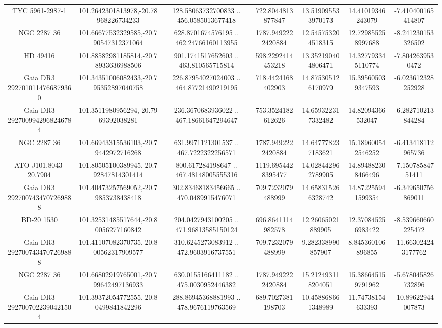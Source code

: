 \begin{table}
\begin{tabular}{ccccccc}
TYC 5961-2987-1 & 101.2642301813978,-20.78968226734233 & 128.58063732700833 .. 456.0585013677418 & 722.8044813877847 & 13.519095533970173 & 14.41019346243079 & -7.410400165414807 \\
NGC  2287    36 & 101.66677532329585,-20.790547312371064 & 628.8701674576195 .. 462.24766160113955 & 1787.9492222420884 & 12.545753204518315 & 12.729855258997688 & -8.241230153326502 \\
HD  49416 & 101.88582981185814,-20.78933636988506 & 901.1741517652603 .. 463.810565715814 & 598.2292414453218 & 13.352190404806471 & 14.327793345110774 & -7.8042639530472 \\
Gaia DR3 2927010114766879360 & 101.34351006082433,-20.795352897040758 & 226.87954027024003 .. 464.87721490219195 & 718.4424168402903 & 14.875305126170979 & 15.395605039347593 & -6.023612328252928 \\
Gaia DR3 2927009942968246784 & 101.3511980956294,-20.7969392038281 & 236.3670683936022 .. 467.18661647294647 & 753.3524182612626 & 14.659322317332482 & 14.82094366532047 & -6.282710213844284 \\
NGC  2287    36 & 101.66943315536103,-20.79442972716268 & 631.9971121301537 .. 467.7222322256571 & 1787.9492222420884 & 14.647778237183621 & 15.189600542546252 & -6.413418112965736 \\
ATO J101.8043-20.7904 & 101.80505100389945,-20.792847814301414 & 800.617284198647 .. 467.48148005555316 & 1119.6954428395477 & 14.028442962789905 & 14.894882308466496 & -7.15078584751411 \\
Gaia DR3 2927007434707269888 & 101.40473257569052,-20.79853738438418 & 302.83468183456665 .. 470.0489915476071 & 709.7232079488999 & 14.658315266328742 & 14.872255941599354 & -6.349650756869011 \\
BD-20  1530 & 101.32531485517644,-20.80056277160842 & 204.0427943100205 .. 471.96813585150124 & 696.8641114982578 & 12.26065021889905 & 12.370845256983422 & -8.539660660225472 \\
Gaia DR3 2927007434707269888 & 101.41107082370735,-20.800562317909577 & 310.6245273083912 .. 472.9603916737551 & 709.7232079488999 & 9.282338990857907 & 8.845360106896855 & -11.663024243177762 \\
NGC  2287    36 & 101.66802919765001,-20.799642497136933 & 630.0155166411182 .. 475.0030952446382 & 1787.9492222420884 & 15.212493118204051 & 15.386645159791962 & -5.678045826732896 \\
Gaia DR3 2927007022390421504 & 101.39372054772555,-20.80499841842296 & 288.86945368881993 .. 478.9676119763569 & 689.7027381198703 & 10.458868661348989 & 11.74738154633393 & -10.89622944007873 \\

\end{tabular}
\end{table}
